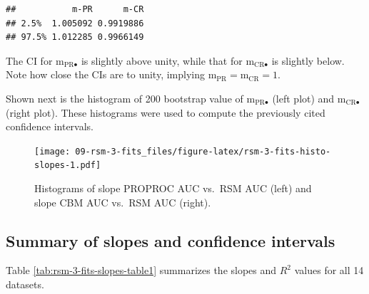\documentclass[
]{book}
\begin{document}
\begin{verbatim}
##           m-PR      m-CR
## 2.5%  1.005092 0.9919886
## 97.5% 1.012285 0.9966149
\end{verbatim}

The CI for \(\text{m}_{\text{PR} \bullet}\) is slightly above unity, while that for \(\text{m}_{\text{CR} \bullet}\) is slightly below. Note how close the CIs are to unity, implying \(\text{m}_{\text{PR}} = \text{m}_{\text{CR}} = 1\).

Shown next is the histogram of 200 bootstrap value of \(\text{m}_{\text{PR} \bullet}\) (left plot) and \(\text{m}_{\text{CR} \bullet}\) (right plot). These histograms were used to compute the previously cited confidence intervals.

\begin{figure}
\centering
\texttt{[image: 09-rsm-3-fits\_files/figure-latex/rsm-3-fits-histo-slopes-1.pdf]}
\caption{\label{fig:rsm-3-fits-histo-slopes}Histograms of slope PROPROC AUC vs.~RSM AUC (left) and slope CBM AUC vs.~RSM AUC (right).}
\end{figure}

\hypertarget{rsm-3-fits-slopes-confidence-intervals-summary}{%
\subsection{Summary of slopes and confidence intervals}\label{rsm-3-fits-slopes-confidence-intervals-summary}}

Table \ref{tab:rsm-3-fits-slopes-table1} summarizes the slopes and \(R^2\) values for all 14 datasets.
\end{document}
